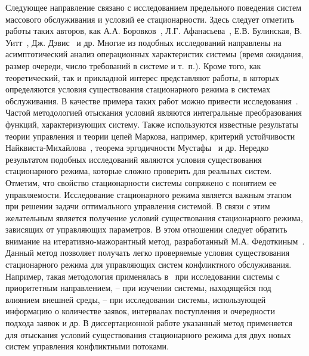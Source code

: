 Следующее направление связано с исследованием предельного поведения систем массового обслуживания и условий ее стационарности. Здесь следует отметить работы таких авторов, как А.А. Боровков~\cite{Borovrkov1964,Borovrkov1980}, Л.Г. Афанасьева~\cite{Afanasieva2008,Afanasieva2011}, Е.В. Булинская, В. Уитт~\cite{Whitt1971,Whitt1982}, Дж. Дэвис~\cite{Davis1995} и др. Многие из подобных исследований направлены на асимптотический анализ операционных характеристик системы (время ожидания, размер очереди, число требований в системе и т.~п.). Кроме того, как теоретический, так и прикладной интерес представляют работы, в которых определяются условия существования стационарного режима в системах обслуживания. В качестве примера таких работ можно привести исследования~\cite{Loynes1962,Davis1972,Choudhury1995,Whitt2014}. Частой методологией отыскания условий являются интегральные преобразования функций, характеризующих систему. Также используются известные результаты теории управления и теории цепей Маркова, например, критерий устойчивости Найквиста-Михайлова~\cite{Davis1972}, теорема эргодичности Мустафы~\cite{Nazarov2011} и др. Нередко результатом подобных исследований являются условия существования стационарного режима, которые сложно проверить для реальных систем. Отметим, что свойство стационарности системы сопряжено с понятием ее управляемости. Исследование стационарного режима является важным этапом при решении задачи оптимального управления системой. В связи с этим желательным является получение условий существования стационарного режима, зависящих от управляющих параметров. В этом отношении следует обратить внимание на итеративно-мажорантный метод, разработанный М.А. Федоткиным~\cite{Fedotkin1988,Fedotkin1989}. Данный метод позволяет получать легко проверяемые условия существования стационарного режима для управляющих систем конфликтного обслуживания. Например, такая методология применялась в~\cite{Proidakova2007} при исследовании системы с приоритетным направлением, \cite{Zorin2008} -- при изучении системы, находящейся под влиянием внешней среды, \cite{LitvakDissertation} -- при исследовании системы, использующей информацию о количестве заявок, интервалах поступления и очередности подхода заявок и др. В диссертационной работе указанный метод применяется для отыскания условий существования стационарного режима для двух новых систем управления конфликтными потоками.

